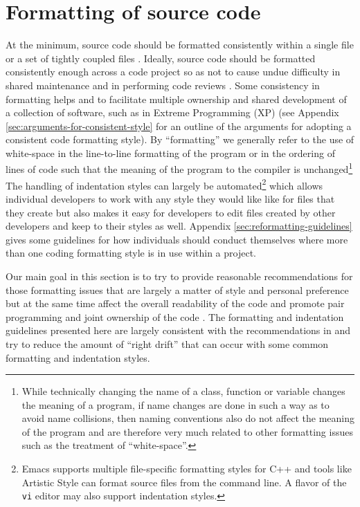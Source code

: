 %
\section{Formatting of source code}
\label{thyracodingguidelines:formatting:sec}
%

At the minimum, source code should be formatted consistently within a single
file or a set of tightly coupled files {}\cite[Item 0]{C++CodingStandards05}.
Ideally, source code should be formatted consistently enough across a code
project so as not to cause undue difficulty in shared maintenance and in
performing code reviews {}\cite{CodeComplete2nd04}.  Some consistency in
formatting helps and to facilitate multiple ownership and shared development
of a collection of software, such as in Extreme Programming (XP)
{}\cite{ExtremeProgrammingExplained99} (see Appendix
{}\ref{sec:arguments-for-consistent-style} for an outline of the arguments for
adopting a consistent code formatting style).  By ``formatting'' we generally
refer to the use of white-space in the line-to-line formatting of the program or
in the ordering of lines of code such that the meaning of the program to the
compiler is unchanged\footnote{While technically changing the name of a class,
function or variable changes the meaning of a program, if name changes are
done in such a way as to avoid name collisions, then naming conventions also
do not affect the meaning of the program and are therefore very much related
to other formatting issues such as the treatment of ``white-space''.}  The
handling of indentation styles can largely be automated\footnote{Emacs
supports multiple file-specific formatting styles for C++ and tools like
Artistic Style {}\cite{ArtisticStyle} can format source files from the command
line.  A flavor of the {}\texttt{vi} editor may also support indentation
styles. } which allows individual developers to work with any style they would
like like for files that they create but also makes it easy for developers to
edit files created by other developers and keep to their styles as well.
Appendix {}\ref{sec:reformatting-guidelines} gives some guidelines for how
individuals should conduct themselves where more than one coding formatting
style is in use within a project.

Our main goal in this section is to try to provide reasonable recommendations
for those formatting issues that are largely a matter of style and personal
preference but at the same time affect the overall readability of the code and
promote pair programming and joint ownership of the code
{}\cite{ExtremeProgrammingExplained99}.  The formatting and indentation
guidelines presented here are largely consistent with the recommendations in
{}\cite[Chapter 31]{CodeComplete2nd04} and try to reduce the amount of ``right
drift'' that can occur with some common formatting and indentation styles.

